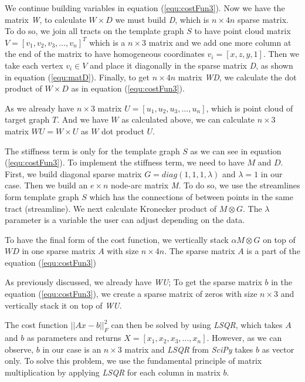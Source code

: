 \documentclass[../structure.tex]{subfiles}
\begin{document}
We continue building variables in equation (\ref{equ:costFun3}). Now we have the matrix \textit{W}, to calculate $W\times D$ we must build \textit{D}, which is $n\times 4n$ sparse matrix. To do so, we join all tracts on the template graph $S$ to have point cloud matrix $V=[v_{1}, v_{2}, v_{3}, \dots , v_{n}]^T$ which is a $n\times 3$ matrix and we add one more column at the end of the matrix to have homogeneous coordinates $v_{i}=[x,z,y,1]$. Then we take each vertex $v_{i} \in V$ and place it diagonally in the sparse matrix \textit{D}, as shown in equation (\ref{equ:matD}). Finally, to get $n\times 4n$ matrix \textit{WD}, we calculate the dot product of $W\times D$ as in equation (\ref{equ:costFun3}).

As we already have $n\times 3$ matrix $U=[u_{1}, u_{2}, u_{3}, \dots , u_{n}]$, which is point cloud of target graph $T$. And we have $W$ as calculated above, we can calculate $n\times 3$ matrix $WU=W\times U$ as $W$ dot product $U$.

The stiffness term is only for the template graph $S$ as we can see in equation (\ref{equ:costFun3}). To implement the stiffness term, we need to have $M$ and $D$. First, we build diagonal sparse matrix $G = diag(1,1,1,\lambda)$ and $\lambda=1$ in our case. Then we build an $e\times n$ node-arc matrix \textit{M}. To do so, we use the streamlines form template graph $S$ which has the connections of between points in the same tract (streamline). We next calculate Kronecker product of $M \otimes G$. The $\lambda$ parameter is a variable the user can adjust depending on the data.

To have the final form of the cost function, we vertically stack $\alpha M \otimes G$ on top of $WD$ in one sparse matrix $A$ with size $n\times 4n$.  The sparse matrix $A$ is a part of the equation (\ref{equ:costFun3})

As previously discussed, we already have \textit{WU}; To get the sparse matrix $b$ in the equation (\ref{equ:costFun3}), we create a sparse matrix of zeros with size $n\times 3$ and vertically stack it on top of \textit{WU}.

The cost function $||Ax-b||_{F}^2$ can then be solved by using \textit{LSQR}, which takes $A$ and $b$ as parameters and returns $X=[x_{1}, x_{2}, x_{3}, \dots, x_{n}]$. However, as we can observe, $b$ in our case is an $n\times 3$ matrix and \textit{LSQR} from \textit{SciPy} takes $b$ as vector only. To solve this problem, we use the fundamental principle of matrix multiplication by applying \textit{LSQR} for each column in matrix $b$.
\end{document}
